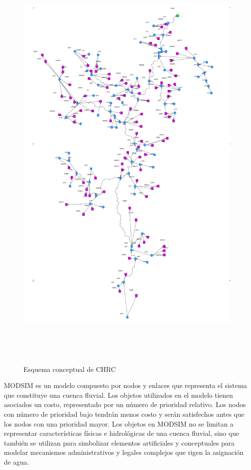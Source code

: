 \begin{figure}[h!]
    \begin{center}
      \includegraphics[height=8.5in]{Figures/modzim/figs.png}
      \caption{ Esquema conceptual de CHRC}
      \label{caudales}
    \end{center}
  \end{figure}

  MODSIM es un modelo compuesto por nodos y enlaces que representa el sistema que constituye una cuenca fluvial. 
  Los objetos utilizados en el modelo tienen asociados un costo, representado por un número de prioridad relativo. 
  Los nodos con número de prioridad bajo tendrán menos costo y serán satisfechos antes que los nodos con una prioridad
  mayor. Los objetos en MODSIM no se limitan a representar características físicas e hidrológicas de una cuenca 
  fluvial, sino que también se utilizan para simbolizar elementos artificiales y conceptuales para modelar mecanismos
   administrativos y legales complejos que rigen la asignación de agua. 

